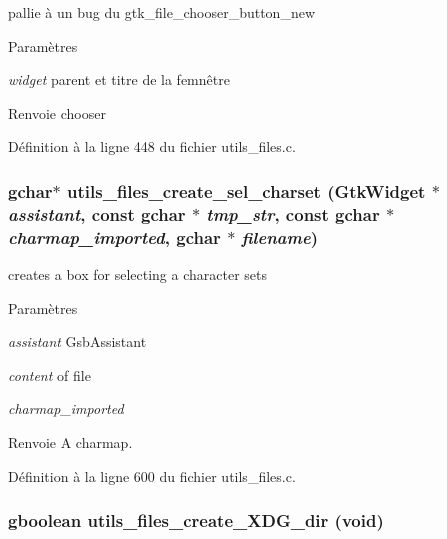 pallie à un bug du gtk\_\-file\_\-chooser\_\-button\_\-new 


\begin{DoxyParams}{Paramètres}
\item[{\em widget}]parent et titre de la femnêtre\end{DoxyParams}
\begin{DoxyReturn}{Renvoie}
chooser 
\end{DoxyReturn}


Définition à la ligne 448 du fichier utils\_\-files.c.

\subsubsection[{utils\_\-files\_\-create\_\-sel\_\-charset}]{\setlength{\rightskip}{0pt plus 5cm}gchar$\ast$ utils\_\-files\_\-create\_\-sel\_\-charset (GtkWidget $\ast$ {\em assistant}, \/  const gchar $\ast$ {\em tmp\_\-str}, \/  const gchar $\ast$ {\em charmap\_\-imported}, \/  gchar $\ast$ {\em filename})}\label{utils__files_8h_a317adcd21f47902ddbd7b39ea98a8ec6}
creates a box for selecting a character sets


\begin{DoxyParams}{Paramètres}
\item[{\em assistant}]GsbAssistant \item[{\em content}]of file \item[{\em charmap\_\-imported}]\end{DoxyParams}
\begin{DoxyReturn}{Renvoie}
A charmap. 
\end{DoxyReturn}


Définition à la ligne 600 du fichier utils\_\-files.c.

\subsubsection[{utils\_\-files\_\-create\_\-XDG\_\-dir}]{\setlength{\rightskip}{0pt plus 5cm}gboolean utils\_\-files\_\-create\_\-XDG\_\-dir (void)}\label{utils__files_8h_a2bf4ade67ac3b60272da8b85baaff59b}


